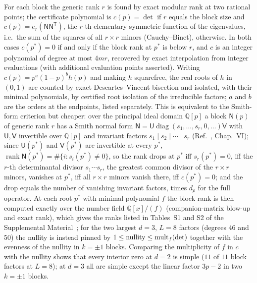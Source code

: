 \documentclass[aps,prx,reprint,superscriptaddress,nobibnotes,longbibliography]{revtex4-2}
\theoremstyle{remark}
\newcommand{\rk}{\operatorname{rank}}
\begin{document}
For each block the generic rank $r$ is found by exact modular rank at two rational points; the certificate polynomial is $c(p)=\det$ if $r$ equals the block size and $c(p)=e_r(\mathsf N\mathsf N^{\mathsf T})$, the $r$-th elementary symmetric function of the eigenvalues, i.e.\ the sum of the squares of all $r\times r$ minors (Cauchy--Binet), otherwise.  In both cases $c(p^*)=0$ if and only if the block rank at $p^*$ is below $r$, and $c$ is an integer polynomial of degree at most $4mr$, recovered by exact interpolation from integer evaluations (with additional evaluation points asserted).  Writing $c(p)=p^a(1-p)^bh(p)$ and making $h$ squarefree, the real roots of $h$ in $(0,1)$ are counted by exact Descartes--Vincent bisection and isolated, with their minimal polynomials, by certified root isolation of the irreducible factors; $a$ and $b$ are the orders at the endpoints, listed separately.  This is equivalent to the Smith-form criterion but cheaper: over the principal ideal domain $\mathbb Q[p]$ a block $\mathsf N(p)$ of generic rank $r$ has a Smith normal form $\mathsf N=\mathsf U\operatorname{diag}(s_1,\ldots,s_r,0,\ldots)\mathsf V$ with $\mathsf U,\mathsf V$ invertible over $\mathbb Q[p]$ and invariant factors $s_1\mid s_2\mid\cdots\mid s_r$ (Ref.~\cite{Gantmacher1959}, Chap.~VI); since $\mathsf U(p^*)$ and $\mathsf V(p^*)$ are invertible at every $p^*$, $\rk\mathsf N(p^*)=\#\{i:s_i(p^*)\ne0\}$, so the rank drops at $p^*$ iff $s_r(p^*)=0$, iff the $r$-th determinantal divisor $s_1\cdots s_r$, the greatest common divisor of the $r\times r$ minors, vanishes at $p^*$, iff all $r\times r$ minors vanish there, iff $c(p^*)=0$; and the drop equals the number of vanishing invariant factors, times $d_\rho$ for the full operator.  At each root $p^*$ with minimal polynomial $f$ the block rank is then computed exactly over the number field $\mathbb Q[x]/(f)$ (companion-matrix blow-up and exact rank), which gives the ranks listed in Tables~S1 and S2 of the Supplemental Material~\cite{SM}; for the two largest $d=3$, $L=8$ factors (degrees $46$ and $50$) the nullity is instead pinned by $1\le{\rm nullity}\le{\rm mult}_f(\det)$ together with the evenness of the nullity in $k=\pm1$ blocks.  Comparing the multiplicity of $f$ in $c$ with the nullity shows that every interior zero at $d=2$ is simple ($11$ of $11$ block factors at $L=8$); at $d=3$ all are simple except the linear factor $3p-2$ in two $k=\pm1$ blocks.
\end{document}
